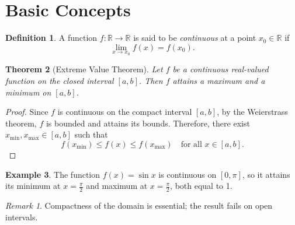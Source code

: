 \documentclass{article}
\theoremstyle{plain}
\newtheorem{theorem}{Theorem}[section]
\theoremstyle{definition}
\newtheorem{definition}[theorem]{Definition}
\newtheorem{example}[theorem]{Example}
\theoremstyle{remark}
\newtheorem*{remark}{Remark}
\begin{document}
\section{Basic Concepts}

\begin{definition}
A function \( f: \mathbb{R} \to \mathbb{R} \) is said to be \emph{continuous} at a point \( x_0 \in \mathbb{R} \) if
\[
\lim_{x \to x_0} f(x) = f(x_0).
\]
\end{definition}

\begin{theorem}[Extreme Value Theorem]
Let \( f \) be a continuous real-valued function on the closed interval \( [a, b] \). Then \( f \) attains a maximum and a minimum on \( [a, b] \).
\end{theorem}

\begin{proof}
Since \( f \) is continuous on the compact interval \( [a, b] \), by the Weierstrass theorem, \( f \) is bounded and attains its bounds. Therefore, there exist \( x_{\min}, x_{\max} \in [a, b] \) such that
\[
f(x_{\min}) \leq f(x) \leq f(x_{\max}) \quad \text{for all } x \in [a, b].
\]
\end{proof}

\begin{example}
The function \( f(x) = \sin x \) is continuous on \( [0, \pi] \), so it attains its minimum at \( x = \frac{\pi}{2} \) and maximum at \( x = \frac{\pi}{2} \), both equal to 1.
\end{example}

\begin{remark}
Compactness of the domain is essential; the result fails on open intervals.
\end{remark}
\end{document}
